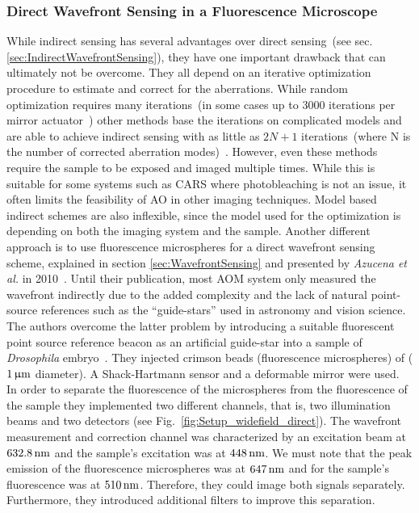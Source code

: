 \subsubsection{Direct Wavefront Sensing in a Fluorescence Microscope}
\label{sec:DirectFluorescenceMicroscope}

While indirect sensing has several advantages over direct sensing~(see sec. \ref{sec:IndirectWavefrontSensing}), they have one important drawback that can ultimately not be overcome. They all depend on an iterative optimization procedure to estimate and correct for the aberrations. While random optimization requires many iterations~(in some cases up to 3000 iterations per mirror actuator~\cite{scan_CARS}) other methods base the iterations on complicated models and are able to achieve indirect sensing with as little as $2N+1$ iterations~(where N is the number of corrected aberration modes)~\cite{wide_AOM_loew_freq,wide_AOM_structured_illu,scan_TPFM_image_based}. However, even these methods require the sample to be exposed and imaged multiple times. While this is suitable for some systems such as CARS where photobleaching is not an issue, it often limits the feasibility of AO in other imaging techniques. Model based indirect schemes are also inflexible, since the model used for the optimization is depending on both the imaging system and the sample. Another different approach is to use fluorescence microspheres for a direct wavefront sensing scheme, explained in section \ref{sec:WavefrontSensing} and presented by \emph{Azucena et al.} in 2010~\cite{wide_fluorescence_guide_star}. Until their publication, most AOM system only measured the wavefront indirectly due to the added complexity and the lack of natural point-source references such as the ``guide-stars'' used in astronomy and vision science. The authors overcome the latter problem by introducing a suitable fluorescent point source reference beacon as an artificial guide-star into a sample of \emph{Drosophila} embryo~\cite{wide_directSensing_microscope}. They injected crimson beads (fluorescence microspheres) of ($\unit[1]{\upmu m}$ diameter). A Shack-Hartmann sensor and a deformable mirror were used. In order to separate the fluorescence of the microspheres from the fluorescence of the sample they implemented two different channels, that is, two illumination beams and two detectors (see Fig.~\ref{fig:Setup_widefield_direct}). The wavefront measurement and correction channel was characterized by an excitation beam at $\unit[632.8]{nm}$ and the sample's excitation was at $\unit[448]{nm}$. We must note that the peak emission of the fluorescence microspheres was at $\unit[647]{nm}$ and for the sample's fluorescence was at $\unit[510]{nm}$. Therefore, they could image both signals separately. Furthermore, they introduced additional filters to improve this separation.

